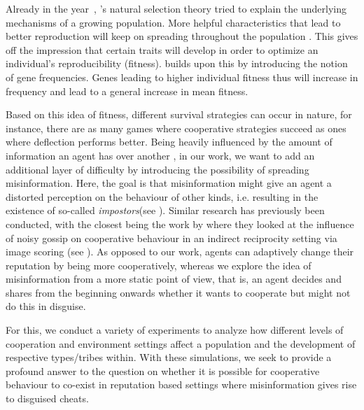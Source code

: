 \documentclass[sigconf]{acmart}
\newcommand{\impostors}{\textit{impostors}\xspace}
\begin{document}
    Already in the year~\citeyear{darwin_origin_1859}, \citeauthor{darwin_origin_1859}'s natural selection theory tried to explain the underlying mechanisms of a growing population.
    More helpful characteristics that lead to better reproduction will keep on spreading throughout the population \cite{darwin_origin_1859}.
    This gives off the impression that certain traits will develop in order to optimize an individual's reproducibility (fitness). \citeauthor{fisherGeneticalTheoryNatural1930} \cite{fisherGeneticalTheoryNatural1930} builds upon this by introducing the notion of gene frequencies.
    Genes leading to higher individual fitness thus will increase in frequency and lead to a general increase in mean fitness.



    Based on this idea of fitness, different survival strategies can occur in nature, for instance, there are as many games where cooperative strategies succeed as ones where deflection performs better.
    Being heavily influenced by the amount of information an agent has over another \cite{wallace_misinformation_1973}, in our work, we want to add an additional layer of difficulty by introducing the possibility of spreading misinformation.
    Here, the goal is that misinformation might give an agent a distorted perception on the behaviour of other kinds, i.e. resulting in the existence of so-called \impostors (see ).
    Similar research has previously been conducted, with the closest being the work by \citeauthor{szamado_deception_2016} \cite{szamado_deception_2016} where they looked at the influence of noisy gossip on cooperative behaviour in an indirect reciprocity setting via image scoring (see ).
    As opposed to our work, agents can adaptively change their reputation by being more cooperatively, whereas we explore the idea of misinformation from a more static point of view, that is, an agent decides and shares from the beginning onwards whether it wants to cooperate but might not do this in disguise.

    For this, we conduct a variety of experiments to analyze how different levels of cooperation and environment settings affect a population and the development of respective types/tribes within.
    With these simulations, we seek to provide a profound answer to the question on whether it is possible for cooperative behaviour to co-exist in reputation based settings where misinformation gives rise to disguised cheats.
\end{document}
